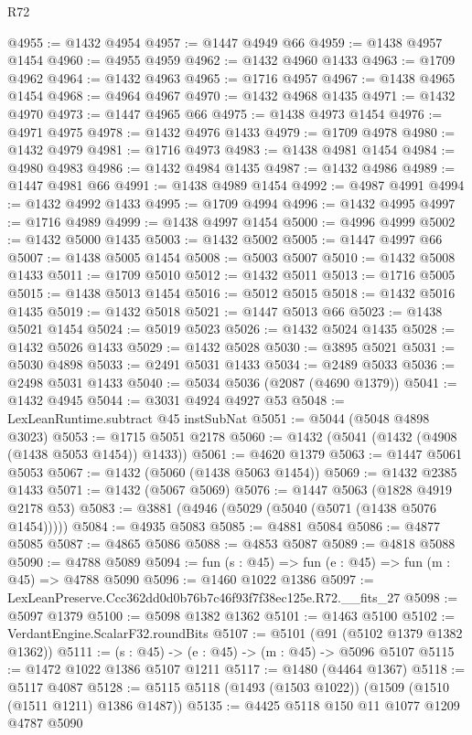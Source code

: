 \begin{lexlean}{R72}
\begin{coremodule}
@4955 := @1432 @4954
@4957 := @1447 @4949 @66
@4959 := @1438 @4957 @1454
@4960 := @4955 @4959
@4962 := @1432 @4960 @1433
@4963 := @1709 @4962
@4964 := @1432 @4963
@4965 := @1716 @4957
@4967 := @1438 @4965 @1454
@4968 := @4964 @4967
@4970 := @1432 @4968 @1435
@4971 := @1432 @4970
@4973 := @1447 @4965 @66
@4975 := @1438 @4973 @1454
@4976 := @4971 @4975
@4978 := @1432 @4976 @1433
@4979 := @1709 @4978
@4980 := @1432 @4979
@4981 := @1716 @4973
@4983 := @1438 @4981 @1454
@4984 := @4980 @4983
@4986 := @1432 @4984 @1435
@4987 := @1432 @4986
@4989 := @1447 @4981 @66
@4991 := @1438 @4989 @1454
@4992 := @4987 @4991
@4994 := @1432 @4992 @1433
@4995 := @1709 @4994
@4996 := @1432 @4995
@4997 := @1716 @4989
@4999 := @1438 @4997 @1454
@5000 := @4996 @4999
@5002 := @1432 @5000 @1435
@5003 := @1432 @5002
@5005 := @1447 @4997 @66
@5007 := @1438 @5005 @1454
@5008 := @5003 @5007
@5010 := @1432 @5008 @1433
@5011 := @1709 @5010
@5012 := @1432 @5011
@5013 := @1716 @5005
@5015 := @1438 @5013 @1454
@5016 := @5012 @5015
@5018 := @1432 @5016 @1435
@5019 := @1432 @5018
@5021 := @1447 @5013 @66
@5023 := @1438 @5021 @1454
@5024 := @5019 @5023
@5026 := @1432 @5024 @1435
@5028 := @1432 @5026 @1433
@5029 := @1432 @5028
@5030 := @3895 @5021
@5031 := @5030 @4898
@5033 := @2491 @5031 @1433
@5034 := @2489 @5033
@5036 := @2498 @5031 @1433
@5040 := @5034 @5036 (@2087 (@4690 @1379))
@5041 := @1432 @4945
@5044 := @3031 @4924 @4927 @53
@5048 := LexLeanRuntime.subtract @45 instSubNat
@5051 := @5044 (@5048 @4898 @3023)
@5053 := @1715 @5051 @2178
@5060 := @1432 (@5041 (@1432 (@4908 (@1438 @5053 @1454)) @1433))
@5061 := @4620 @1379
@5063 := @1447 @5061 @5053
@5067 := @1432 (@5060 (@1438 @5063 @1454))
@5069 := @1432 @2385 @1433
@5071 := @1432 (@5067 @5069)
@5076 := @1447 @5063 (@1828 @4919 @2178 @53)
@5083 := @3881 (@4946 (@5029 (@5040 (@5071 (@1438 @5076 @1454)))))
@5084 := @4935 @5083
@5085 := @4881 @5084
@5086 := @4877 @5085
@5087 := @4865 @5086
@5088 := @4853 @5087
@5089 := @4818 @5088
@5090 := @4788 @5089
@5094 := fun (s : @45) => fun (e : @45) => fun (m : @45) => @4788 @5090
@5096 := @1460 @1022 @1386
@5097 := LexLeanPreserve.Ccc362dd0d0b76b7c46f93f7f38ec125e.R72.__fits_27
@5098 := @5097 @1379
@5100 := @5098 @1382 @1362
@5101 := @1463 @5100
@5102 := VerdantEngine.ScalarF32.roundBits
@5107 := @5101 (@91 (@5102 @1379 @1382 @1362))
@5111 := (s : @45) -> (e : @45) -> (m : @45) -> @5096 @5107
@5115 := @1472 @1022 @1386 @5107 @1211
@5117 := @1480 (@4464 @1367)
@5118 := @5117 @4087
@5128 := @5115 @5118 (@1493 (@1503 @1022)) (@1509 (@1510 (@1511 @1211) @1386 @1487))
@5135 := @4425 @5118 @150 @11 @1077 @1209 @4787 @5090

\end{coremodule}
\end{lexlean}
